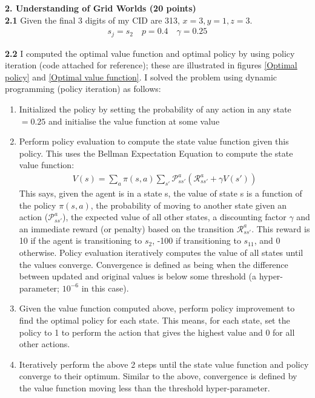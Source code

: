 \documentclass[12pt,twoside]{article}
\begin{document}
\textbf{2. Understanding of Grid Worlds (20 points)} \\

\textbf{2.1} Given the final 3 digits of my CID are 313, $x=3, y=1, z=3$.
\begin{align}
    s_j = s_2 \quad p =0.4 \quad \gamma = 0.25
\end{align}

\textbf{2.2} I computed the optimal value function and optimal policy by using policy iteration (code attached for reference); these are illustrated in figures \ref{Optimal policy} and \ref{Optimal value function}. I solved the problem using dynamic programming (policy iteration) as follows:
\begin{enumerate}
    \item Initialized the policy by setting the probability of any action in any state $= 0.25$ and initialise the value function at some value
    \item Perform policy evaluation to compute the state value function given this policy. This uses the Bellman Expectation Equation to compute the state value function:
    \begin{align}
        V(s) = \sum_a \pi(s,a) \sum_{s'} \mathcal{P}^a_{ss'} (\mathcal{R}^a_{ss'} + \gamma V(s'))
    \end{align}
    This says, given the agent is in a state s, the value of state s is a function of the policy $\pi(s,a)$, the probability of moving to another state given an action ($\mathcal{P}^a_{ss'}$), the expected value of all other states, a discounting factor $\gamma$ and an immediate reward (or penalty) based on the transition $\mathcal{R}^a_{ss'}$. This reward is 10 if the agent is transitioning to $s_2$, -100 if transitioning to $s_{11}$, and 0 otherwise. Policy evaluation iteratively computes the value of all states until the values converge. Convergence is defined as being when the difference between updated and original values is below some threshold (a hyper-parameter; $10^{-6}$ in this case).
    \item Given the value function computed above, perform policy improvement to find the optimal policy for each state. This means, for each state, set the policy to 1 to perform the action that gives the highest value and 0 for all other actions.
    \item Iteratively perform the above 2 steps until the state value function and policy converge to their optimum. Similar to the above, convergence is defined by the value function moving less than the threshold hyper-parameter.
\end{enumerate}
\end{document}
